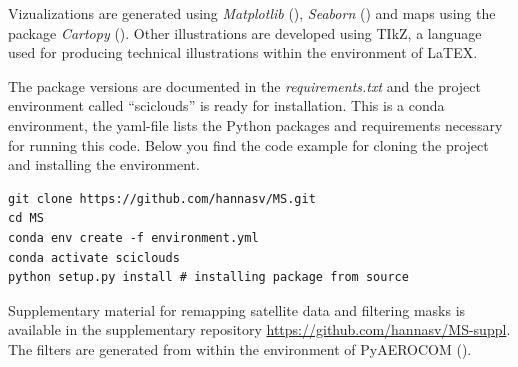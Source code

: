 Vizualizations are generated using \textit{Matplotlib} (\cite{matplotlib}), \textit{Seaborn} (\cite{seaborn}) and maps using the package \textit{Cartopy} (\cite{Cartopy}). Other illustrations are developed using TIkZ, a language used for producing technical illustrations within the environment of LaTEX.

The package versions are documented in the \textit{requirements.txt} and the project environment called ``sciclouds'' is ready for installation. This is a conda environment, the yaml-file lists the Python packages and requirements necessary for running this code. Below you find the code example for cloning the project and installing the environment.

\begin{verbatim}
git clone https://github.com/hannasv/MS.git
cd MS
conda env create -f environment.yml
conda activate sciclouds
python setup.py install # installing package from source
\end{verbatim}

Supplementary material for remapping satellite data and filtering masks is available in the supplementary repository \href{https://github.com/hannasv/MS-suppl}{https://github.com/hannasv/MS-suppl}. %
The filters are generated from within the environment of PyAEROCOM (\cite{pyaerocom}). 



